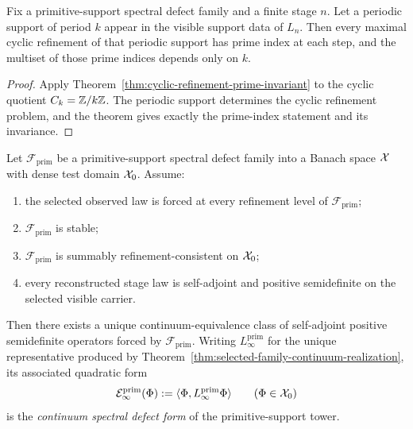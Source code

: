 \begin{corollary}
\label{cor:primitive-support-prime-refinement}
Fix a primitive-support spectral defect family and a finite stage \(n\). Let a
periodic support of period \(k\) appear in the visible support data of
\(L_n\). Then every maximal cyclic refinement of that periodic support has
prime index at each step, and the multiset of those prime indices depends only
on \(k\).
\end{corollary}

\begin{proof}
Apply Theorem~\ref{thm:cyclic-refinement-prime-invariant} to the cyclic
quotient \(C_k=\mathbb{Z}/k\mathbb{Z}\). The periodic support determines the cyclic
refinement problem, and the theorem gives exactly the prime-index statement and
its invariance.
\end{proof}

\begin{corollary}
\label{cor:primitive-support-continuum-spectral-defect}
Let \(\mathcal F_{\mathrm{prim}}\) be a primitive-support spectral defect
family into a Banach space \(\mathcal{X}\) with dense test domain \(\mathcal{X}_0\). Assume:
\begin{enumerate}[label=(\roman*), leftmargin=2em, itemsep=0.2em]
\item the selected observed law is forced at every refinement level of
      \(\mathcal F_{\mathrm{prim}}\);
\item \(\mathcal F_{\mathrm{prim}}\) is stable;
\item \(\mathcal F_{\mathrm{prim}}\) is summably refinement-consistent on
      \(\mathcal{X}_0\);
\item every reconstructed stage law is self-adjoint and positive semidefinite
      on the selected visible carrier.
\end{enumerate}
Then there exists a unique continuum-equivalence class of self-adjoint
positive semidefinite operators forced by
\(\mathcal F_{\mathrm{prim}}\). Writing \(L_{\infty}^{\mathrm{prim}}\) for the
unique representative produced by
Theorem~\ref{thm:selected-family-continuum-realization}, its associated
quadratic form
\[
\mathcal E_{\infty}^{\mathrm{prim}}(\Phi)
:=
\langle \Phi,L_{\infty}^{\mathrm{prim}}\Phi\rangle
\qquad (\Phi\in\mathcal{X}_0)
\]
is the \emph{continuum spectral defect form} of the primitive-support tower.
\end{corollary}

